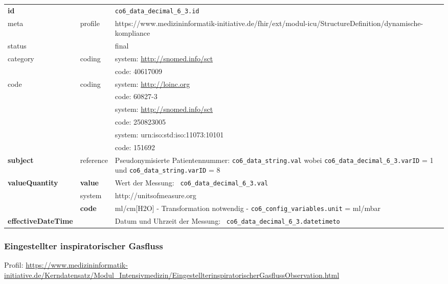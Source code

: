\begin{longtable}{|l|l|p{7.5cm}|}
	\hline
	\rowcolor{lightgray} \multicolumn{3}{|l|}{Data Mapping (inhaltlich)} \\ \hline
	\textbf{id} &  & \texttt{co6\_data\_decimal\_6\_3.id} \\ \hline
	meta & profile & https://www.medizininformatik-initiative.de/fhir/ext/modul-icu/StructureDefinition/dynamische-kompliance \\ \hline 
	status &  & final   \\ \hline 
	category & coding & system: \url{http://snomed.info/sct} \\
	\cline{3-3}
	& & code: 40617009 \\ \hline
	code & coding & system: \url{http://loinc.org} \\ 
	\cline{3-3} 
	&  & code: 60827-3 \\ 
	\cline{3-3} 
	&  & system: \url{http://snomed.info/sct} \\ 
	\cline{3-3} 
	&  & code: 250823005 \\ 
	\cline{3-3} 
	&  & system: urn:iso:std:iso:11073:10101 \\ 
	\cline{3-3}
	&  & code: 151692 \\ \hline
	\textbf{subject} & reference & Pseudonymisierte Patientennummer: \texttt{co6\_data\_string.val} wobei \texttt{co6\_data\_decimal\_6\_3.varID} = 1 und \texttt{co6\_data\_string.varID} = 8 \\ \hline
	\textbf{valueQuantity}  & \textbf{value} & Wert der Messung: \texttt{
		co6\_data\_decimal\_6\_3.val} \\
	\cline{2-3}
	& system & http://unitsofmeasure.org \\
	\cline{2-3}
	& \textbf{code} &
	ml/cm[H2O] - Transformation notwendig - \texttt{co6\_config\_variables.unit} = ml/mbar
	\\ \hline
	\textbf{effectiveDateTime}  & & Datum und Uhrzeit der Messung: \texttt{
		co6\_data\_decimal\_6\_3.datetimeto} \\ \hline
\end{longtable}

\subsubsection{Eingestellter inspiratorischer Gasfluss} 

Profil: \url{https://www.medizininformatik-initiative.de/Kerndatensatz/Modul_Intensivmedizin/EingestellterinspiratorischerGasflussObservation.html}

